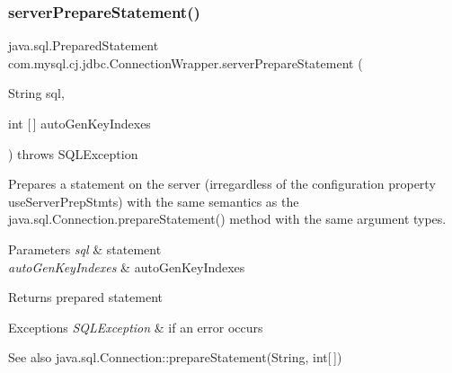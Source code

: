 \mbox{\label{classcom_1_1mysql_1_1cj_1_1jdbc_1_1_connection_wrapper_a9ae046833df9f5a89755a54dd65d43b0}} 
\subsubsection{\texorpdfstring{server\+Prepare\+Statement()}{serverPrepareStatement()}\hspace{0.1cm}{\footnotesize\ttfamily [5/6]}}
{\footnotesize\ttfamily java.\+sql.\+Prepared\+Statement com.\+mysql.\+cj.\+jdbc.\+Connection\+Wrapper.\+server\+Prepare\+Statement (\begin{DoxyParamCaption}\item[{String}]{sql,  }\item[{int \mbox{[}$\,$\mbox{]}}]{auto\+Gen\+Key\+Indexes }\end{DoxyParamCaption}) throws S\+Q\+L\+Exception}

Prepares a statement on the server (irregardless of the configuration property \textquotesingle{}use\+Server\+Prep\+Stmts\textquotesingle{}) with the same semantics as the java.\+sql.\+Connection.\+prepare\+Statement() method with the same argument types.


\begin{DoxyParams}{Parameters}
{\em sql} & statement \\
\hline
{\em auto\+Gen\+Key\+Indexes} & auto\+Gen\+Key\+Indexes \\
\hline
\end{DoxyParams}
\begin{DoxyReturn}{Returns}
prepared statement 
\end{DoxyReturn}

\begin{DoxyExceptions}{Exceptions}
{\em S\+Q\+L\+Exception} & if an error occurs \\
\hline
\end{DoxyExceptions}
\begin{DoxySeeAlso}{See also}
java.\+sql.\+Connection\+::prepare\+Statement(\+String, int\mbox{[}$\,$\mbox{]}) 
\end{DoxySeeAlso}


